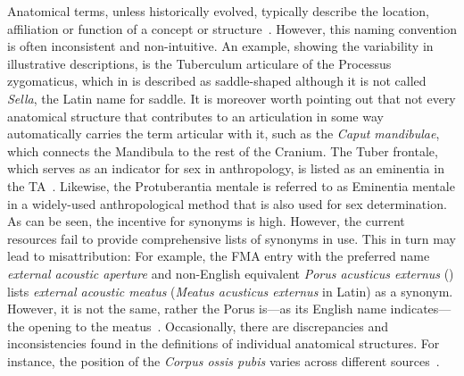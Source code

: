 \documentclass[sw]{iosart2x}
\newcommand{\latin}[1]{\emph{#1}}
\begin{document}
Anatomical terms, unless historically evolved, typically describe the location, affiliation or function of a concept or structure~\citep{reforminganatomical}.
However, this naming convention is often inconsistent and non-intuitive.
An example, showing the variability in illustrative descriptions, is the Tuberculum articulare of the Processus zygomaticus, which in \cite{anatomie} is described as saddle-shaped although it is not called \latin{Sella}, the Latin name for saddle.
It is moreover worth pointing out that not every anatomical structure that contributes to an articulation in some way automatically carries the term articular with it, such as the \latin{Caput mandibulae}, which connects the Mandibula to the rest of the Cranium.
The Tuber frontale, which serves as an indicator for sex in anthropology, is listed as an eminentia in the TA~\citep{ta2}.
Likewise, the Protuberantia mentale is referred to as Eminentia mentale in a widely-used anthropological method that is also used for sex determination.
As can be seen, the incentive for synonyms is high.
However, the current resources fail to provide comprehensive lists of synonyms in use.
This in turn may lead to misattribution: For example, the FMA entry with the preferred name \emph{external acoustic aperture} and non-English equivalent \latin{Porus acusticus externus} ()
lists \emph{external acoustic meatus} (\latin{Meatus acusticus externus} in Latin) as a synonym.
However, it is not the same, rather the Porus is---as its English name indicates---the opening to the meatus~\citep{anatomylexicon}.
Occasionally, there are discrepancies and inconsistencies found in the definitions of individual anatomical structures.
For instance, the position of the \latin{Corpus ossis pubis} varies across different sources~\citep{anatomylexicon,prometheus,allgemeineanatomie,dualereiheanatomie,anatomiedesmenschen}.
\end{document}
